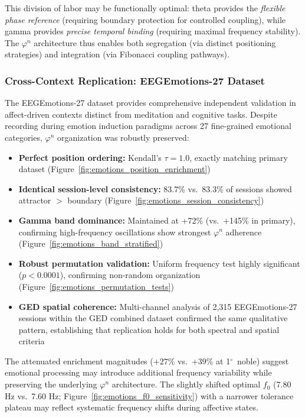 \documentclass[11pt,a4paper]{article}
\newcommand{\degree}{$^\circ$}  %
\newcommand{\phisym}{\varphi}
\begin{document}
This division of labor may be functionally optimal: theta provides the \textit{flexible phase reference} (requiring boundary protection for controlled coupling), while gamma provides \textit{precise temporal binding} (requiring maximal frequency stability). The $\phisym^n$ architecture thus enables both segregation (via distinct positioning strategies) and integration (via Fibonacci coupling pathways).

\subsubsection{Cross-Context Replication: EEGEmotions-27 Dataset}
The EEGEmotions-27 dataset \parencite{huy2025eeg} provides comprehensive independent validation in affect-driven contexts distinct from meditation and cognitive tasks. Despite recording during emotion induction paradigms across 27 fine-grained emotional categories, $\phisym^n$ organization was robustly preserved:

\begin{itemize}
    \item \textbf{Perfect position ordering:} Kendall's $\tau = 1.0$, exactly matching primary dataset (Figure~\ref{fig:emotions_position_enrichment})
    \item \textbf{Identical session-level consistency:} 83.7\% vs.\ 83.3\% of sessions showed attractor $>$ boundary (Figure~\ref{fig:emotions_session_consistency})
    \item \textbf{Gamma band dominance:} Maintained at +72\% (vs.\ +145\% in primary), confirming high-frequency oscillations show strongest $\phisym^n$ adherence (Figure~\ref{fig:emotions_band_stratified})
    \item \textbf{Robust permutation validation:} Uniform frequency test highly significant ($p < 0.0001$), confirming non-random organization (Figure~\ref{fig:emotions_permutation_tests})
    \item \textbf{GED spatial coherence:} Multi-channel analysis of 2,315 EEGEmotions-27 sessions within the GED combined dataset confirmed the same qualitative pattern, establishing that replication holds for both spectral and spatial criteria
\end{itemize}

The attenuated enrichment magnitudes ($+27\%$ vs.\ $+39\%$ at 1\degree\ noble) suggest emotional processing may introduce additional frequency variability while preserving the underlying $\phisym^n$ architecture. The slightly shifted optimal $f_0$ (7.80 Hz vs.\ 7.60 Hz; Figure~\ref{fig:emotions_f0_sensitivity}) with a narrower tolerance plateau may reflect systematic frequency shifts during affective states.
\end{document}
